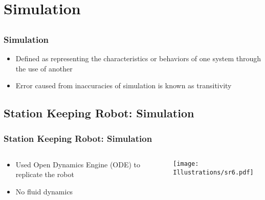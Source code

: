 \documentclass{beamer}
\begin{document}
\section{Simulation}

\subsection{}
\begin{frame}
\frametitle{Simulation}
\begin{itemize}
\item Defined as representing the characteristics or behaviors of one system through the use of another
\item Error caused from inaccuracies of simulation is known as transitivity 
\end{itemize}
\end{frame}

\subsection*{Station Keeping Robot: Simulation}
\begin{frame}
  \frametitle{Station Keeping Robot: Simulation}
\begin{columns}
  \begin{column}{0.5\textwidth}
\begin{itemize}
\item  Used Open Dynamics Engine (ODE) to replicate the robot
\item  No fluid dynamics
\end{itemize}
\end{column}
\begin{column}{0.5\textwidth}
 \texttt{[image: Illustrations/sr6.pdf]}
       \\
\end{column}
\end{columns}
\end{frame}
\end{document}
